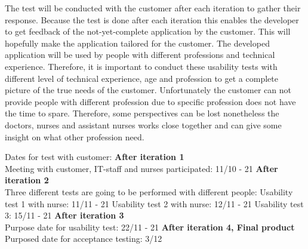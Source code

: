 \noindent The test will be conducted with the customer after each iteration to gather their response. Because the test is done after each iteration this enables the developer to get feedback of the not-yet-complete application by the customer. This will hopefully make the application tailored for the customer. The developed application will be used by people with different professions and technical experience. Therefore, it is important to conduct these usability tests with different level of technical experience, age and profession to get a complete picture of the true needs of the customer. Unfortunately the customer can not provide people with different profession due to specific profession does not have the time to spare. Therefore, some perspectives can be lost nonetheless the doctors, nurses and assistant nurses works close together and can give some insight on what other profession need. \newline

\noindent Dates for test with customer:\newline
\textbf{After iteration 1}\\
Meeting with customer, IT-staff and nurses participated: 11/10 - 21\newline
\textbf{After iteration 2}\\
Three different tests are going to be performed with different people:\newline
Usability test 1 with nurse: 11/11 - 21\newline
Usability test 2 with nurse: 12/11 - 21\newline
Usability test 3: 15/11 - 21\newline
\textbf{After iteration 3}\\
Purpose date for usability test: 22/11 - 21\newline
\textbf{After iteration 4, Final product}\\
Purposed date for acceptance testing: 3/12\newline


